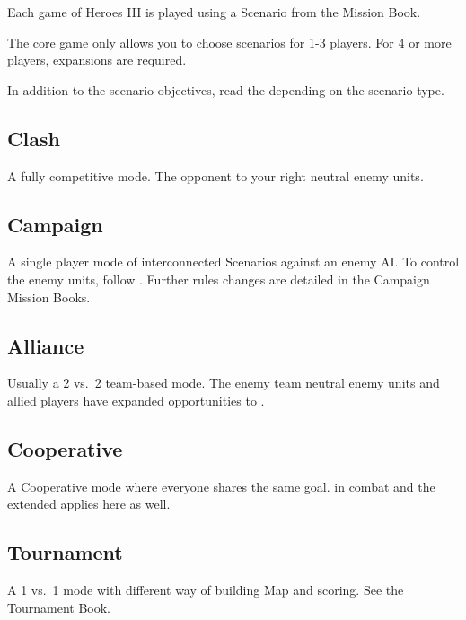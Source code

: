 
\begin{multicols*}{2}

Each game of Heroes III is played using a Scenario from the Mission Book.\par 
The core game only allows you to choose scenarios for 1-3 players. For 4 or more players, expansions are required.\par
In addition to the scenario objectives, read the  depending on the scenario type.

\subsection*{Clash}
A fully competitive mode. The opponent to your right  neutral enemy units.

\subsection*{Campaign}
A single player mode of interconnected Scenarios against an enemy AI.
To control the enemy units, follow .
Further rules changes are detailed in the Campaign Mission Books.

\subsection*{Alliance}
Usually a 2 vs.~2 team-based mode. The enemy team  neutral enemy units and allied players have expanded opportunities to . 

\subsection*{Cooperative}
A Cooperative mode where everyone shares the same goal.  in combat and the extended  applies here as well.

\subsection*{Tournament}
A 1 vs.~1 mode with different way of building Map and scoring. See the Tournament Book.

\begin{center}
\end{center}


\end{multicols*}
